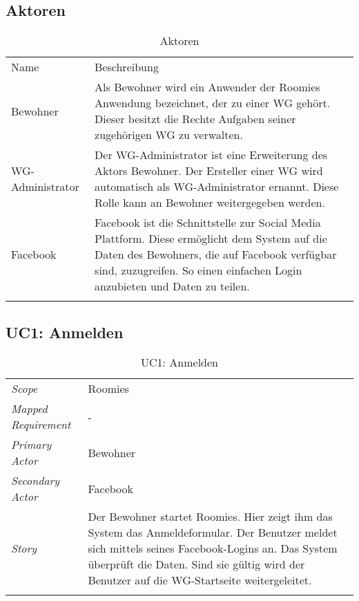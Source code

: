 \subsection{Aktoren}
\begin{table}[H]
	\tablestyle
	\tablealtcolored
	\begin{tabularx}{\textwidth}{lX}
		\tableheadcolor
		\tablehead Name &
		\tablehead Beschreibung \tabularnewline
		\tablebody
			Bewohner &
			Als Bewohner wird ein Anwender der Roomies Anwendung bezeichnet, der zu einer WG gehört. \newline
			Dieser besitzt die Rechte Aufgaben seiner zugehörigen WG zu verwalten.
			\tabularnewline
			WG-Administrator &
			Der WG-Administrator ist eine Erweiterung des Aktors Bewohner. Der Ersteller einer WG wird automatisch als WG-Administrator ernannt. Diese Rolle kann an Bewohner weitergegeben werden.
			\tabularnewline
			Facebook &
			Facebook ist die Schnittstelle zur Social Media Plattform. Diese ermöglicht dem System auf die Daten des Bewohners, die auf Facebook verfügbar sind, zuzugreifen. So einen einfachen Login anzubieten und Daten zu teilen.
			\tabularnewline
		\tableend
	\end{tabularx}
	\caption{Aktoren}
\end{table}

\subsection{UC1: Anmelden}\label{subsec:uc1}
\begin{table}[H]
	\tablestyle
	\tablealtcolored
	\begin{tabularx}{\textwidth}{lX}
		\tablebody
			\textit{Scope} &
			Roomies
			\tabularnewline
			\textit{Mapped Requirement} &
			-
			\tabularnewline
			\textit{Primary Actor} &
			Bewohner
			\tabularnewline
			\textit{Secondary Actor} &
			Facebook
			\tabularnewline
			\textit{Story} &
			Der Bewohner startet Roomies. Hier zeigt ihm das System das Anmeldeformular. Der Benutzer meldet sich mittels seines Facebook-Logins an. Das System überprüft die Daten. Sind sie gültig wird der Benutzer auf die WG-Startseite weitergeleitet.
			\tabularnewline
		\tableend
	\end{tabularx}
	\caption{UC1: Anmelden}
\end{table}


